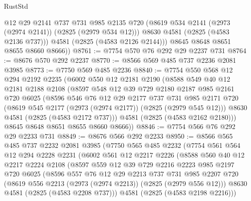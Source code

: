 \begin{lexlean}{RustStd}
\begin{coremodule}
            @12
            @29
            @2141
            @737
            @731
            @985
            @2135
            @720
            (@8619 @534 @2141 (@2973 (@2974 @2141)) (@2825 (@2979 @534 @12)))
            @8630
            @4581
            (@2825 (@4583 @2136 @737)))
          @4581
          (@2825 (@4583 @2126 @2144)))
        @8645
        @8648
        @8651
        @8655
        @8660
        @8666))
@8761 := @7754 @570 @76 @292 @29 @2237 @731
@8764 := @8676 @570 @292 @2237
@8770 := @8566 @569 @485 @737 @2236 @2081 @3985
@8773 := @7750 @569 @485 @2236
@8840 := @7754
    @550
    @568
    @12
    @294
    @2192
    @2235
    (@6002
      @550
      @12
      @2181
      @2190
      (@8588
        @549
        @40
        @12
        @2181
        @2188
        @2108
        (@8597
          @548
          @12
          @39
          @729
          @2180
          @2187
          @985
          @2161
          @720
          @6025
          (@8596
            @546
            @76
            @12
            @29
            @2177
            @737
            @731
            @985
            @2171
            @720
            (@8619 @545 @2177 (@2973 (@2974 @2177)) (@2825 (@2979 @545 @12)))
            @8630
            @4581
            (@2825 (@4583 @2172 @737)))
          @4581
          (@2825 (@4583 @2162 @2180)))
        @8645
        @8648
        @8651
        @8655
        @8660
        @8666))
@8846 := @7754 @566 @76 @292 @29 @2233 @731
@8849 := @8676 @566 @292 @2233
@8950 := @8566
    @565
    @485
    @737
    @2232
    @2081
    @3985
    (@7750
      @565
      @485
      @2232
      (@7754
        @561
        @564
        @12
        @294
        @2228
        @2231
        (@6002
          @561
          @12
          @2217
          @2226
          (@8588
            @560
            @40
            @12
            @2217
            @2224
            @2108
            (@8597
              @559
              @12
              @39
              @729
              @2216
              @2223
              @985
              @2197
              @720
              @6025
              (@8596
                @557
                @76
                @12
                @29
                @2213
                @737
                @731
                @985
                @2207
                @720
                (@8619 @556 @2213 (@2973 (@2974 @2213)) (@2825 (@2979 @556 @12)))
                @8630
                @4581
                (@2825 (@4583 @2208 @737)))
              @4581
              (@2825 (@4583 @2198 @2216)))

\end{coremodule}
\end{lexlean}
